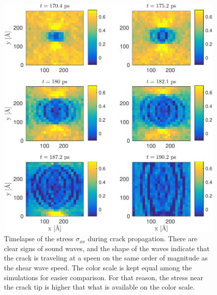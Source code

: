 \begin{figure}
\includegraphics[width=\textwidth]{../figures/thesis/stressfield_timelapse.pdf}
\caption{Timelapse of the stress $\sigma_{xx}$ during crack propagation. There are clear signs of sound waves, and the shape of the waves indicate that the crack is traveling at a speen on the same order of magnitude as the shear wave speed. The color scale is kept equal among the simulations for easier comparison. For that reason, the stress near the crack tip is higher that what is available on the color scale.}
\label{fig:stressfield_timelapse}
\end{figure}

